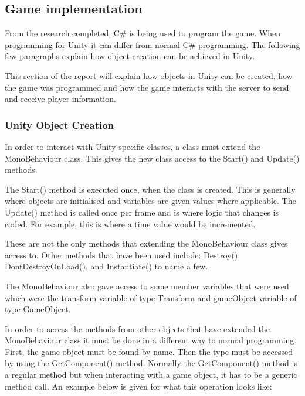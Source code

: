 \documentclass[12pt]{article}
\begin{document}
\subsection{Game implementation}
From the research completed, C{\#} is being used to program the game. When programming for Unity it can differ from normal C{\#} programming. The following few paragraphs explain how object creation can be achieved in Unity.

This section of the report will explain how objects in Unity can be created, how the game was programmed and how the game interacts with the server to send and receive player information. 

\subsubsection{Unity Object Creation}
In order to interact with Unity specific classes, a class must extend the MonoBehaviour class. This gives the new class access to the Start() and Update() methods. 

The Start() method is executed once, when the class is created. This is generally where objects are initialised and variables are given values where applicable. The Update() method is called once per frame and is where logic that changes is coded. For example, this is where a time value would be incremented.

These are not the only methods that extending the MonoBehaviour class gives access to. Other methods that have been used include: Destroy(), DontDestroyOnLoad(), and Instantiate() to name a few. 

The MonoBehaviour also gave access to some member variables that were used which were the transform variable of type Transform and gameObject variable of type GameObject.  

In order to access the methods from other objects that have extended the MonoBehaviour class it must be done in a different way to normal programming. First, the game object must be found by name. Then the type must be accessed by using the GetComponent() method. Normally the GetComponent() method is a regular method but when interacting with a game object, it has to be a generic method call. An example below is given for what this operation looks like:

\end{document}
